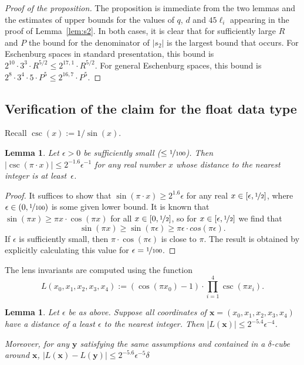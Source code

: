 \documentclass{article}
\newtheorem{lem}[thm]{Lemma}
\newcommand{\abs}[1]{\left|#1\right|}
\renewcommand{\vec}[1]{\mathbf{#1}}
\begin{document}
\begin{proof}[Proof of the proposition]
The proposition is immediate from the two lemmas and the estimates of upper bounds for the values of \(q\), \(d\) and \(45\ell_i\) appearing in the proof of Lemma~\ref{lem:s2}.  In both cases, it is clear that for sufficiently large \(R\) and \(P\) the bound for the denominator of \(\abs{s_2}\) is the largest bound that occurs.  For Eschenburg spaces in standard presentation, this bound is 
\(
2^{10}·3^3·R^{5/2} \leq 2^{17,1}·R^{5/2}.
\)
For general Eschenburg spaces, this bound is
\(
    2^{8}·3^4·5·P^{5} \leq 2^{16,7}·P^5
\).
\end{proof}


\subsection{Verification of the claim for the float data type}
Recall \(\csc(x) := 1/\sin(x)\).

\begin{lem}
  Let \(\epsilon>0\) be sufficiently small (\(\leq \nicefrac{1}{100}\)).  Then
  \(\abs{\csc(\pi·x)} \leq 2^{-1.6} \epsilon^{-1}\) for any real number \(x\) whose distance to the nearest integer is at least~\(\epsilon\).
\end{lem}
\begin{proof}
  It suffices to show that \(\sin(\pi·x) \geq 2^{1.6} \epsilon\) for any real \(x\in [\epsilon,\nicefrac{1}{2}]\), where \(\epsilon \in (0,\nicefrac{1}{100})\) is some given lower bound.  It is known that \(\sin(\pi x) \geq \pi x·\cos(\pi x)\) for all \(x\in [0,\nicefrac{1}{2}]\), so for \(x\in [\epsilon,\nicefrac{1}{2}]\) we find that 
  \[
    \sin(\pi x) \geq \sin(\pi\epsilon) \geq \pi\epsilon·cos(\pi\epsilon).
  \]
  If \(\epsilon\) is sufficiently small, then \(\pi·\cos(\pi\epsilon)\) is close to \(\pi\).
  The result is obtained by explicitly calculating this value for \(\epsilon = \nicefrac{1}{100}\).
%
%
\end{proof}

The lens invariants are computed using the function
\[
  L(x_0,x_1,x_2,x_3,x_4) 
  := (\cos(\pi x_0)-1)
  · \textstyle\prod_{i=1}^{4} \csc(\pi x_i).
\]
\begin{lem}\label{L-bounds}
  Let \(\epsilon\) be as above.  Suppose all coordinates of \(\vec x = (x_0,x_1,x_2,x_3,x_4)\) have a distance of a least \(\epsilon\) to the nearest integer. Then
  \(
  \abs{L(\vec x)} \leq 2^{-5.4}\epsilon^{-4}
  \).
  
  Moreover, for any \(\vec y\) satisfying the same assumptions and contained in a \(\delta\)-cube around \(\vec x\),
  \(
  \abs{L(\vec x) - L(\vec y)} \leq  2^{-5.6}\epsilon^{-5}\delta
  \)
\end{lem}
\end{document}

